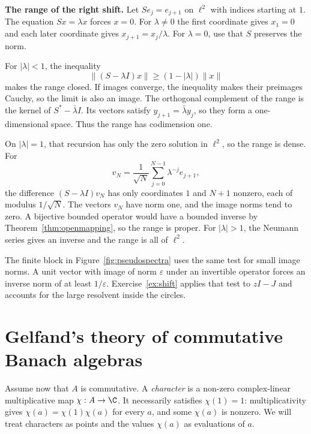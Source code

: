 \textbf{The range of the right shift.} Let $S e_j=e_{j+1}$ on $\ell^2$ with indices starting at $1$. The equation $Sx=\lambda x$ forces $x=0$. For $\lambda\ne0$ the first coordinate gives $x_1=0$ and each later coordinate gives $x_{j+1}=x_j/\lambda$. For $\lambda=0$, use that $S$ preserves the norm.

For $|\lambda|<1$, the inequality
\[
\|(S-\lambda I)x\|\ge(1-|\lambda|)\|x\|
\]
makes the range closed. If images converge, the inequality makes their preimages Cauchy, so the limit is also an image. The orthogonal complement of the range is the kernel of $S^*-\bar\lambda I$. Its vectors satisfy $y_{j+1}=\bar\lambda y_j$, so they form a one-dimensional space. Thus the range has codimension one.

On $|\lambda|=1$, that recursion has only the zero solution in $\ell^2$, so the range is dense. For
\[
v_N=\frac1{\sqrt N}\sum_{j=0}^{N-1}\lambda^{-j}e_{j+1},
\]
the difference $(S-\lambda I)v_N$ has only coordinates $1$ and $N+1$ nonzero, each of modulus $1/\sqrt N$. The vectors $v_N$ have norm one, and the image norms tend to zero. A bijective bounded operator would have a bounded inverse by Theorem~\ref{thm:openmapping}, so the range is proper. For $|\lambda|>1$, the Neumann series gives an inverse and the range is all of $\ell^2$.

The finite block in Figure~\ref{fig:pseudospectra} uses the same test for small image norms. A unit vector with image of norm $\varepsilon$ under an invertible operator forces an inverse norm of at least $1/\varepsilon$. Exercise~\ref{ex:shift} applies that test to $zI-J$ and accounts for the large resolvent inside the circles.

\section{Gelfand's theory of commutative Banach algebras}

Assume now that $A$ is commutative. A \emph{character} is a non-zero complex-linear multiplicative map $\chi:A\to\C$. It necessarily satisfies $\chi(1)=1$: multiplicativity gives $\chi(a)=\chi(1)\chi(a)$ for every $a$, and some $\chi(a)$ is nonzero. We will treat characters as points and the values $\chi(a)$ as evaluations of $a$.

